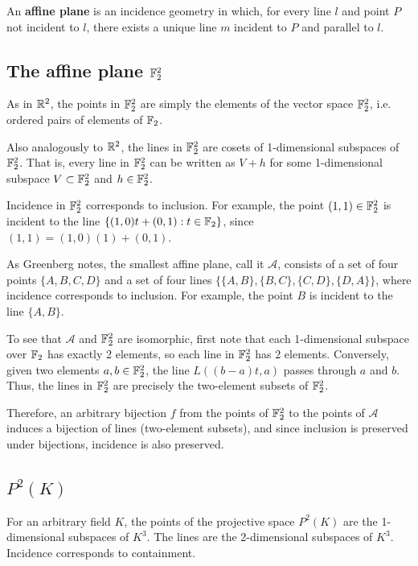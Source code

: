 \documentclass{article}
\begin{document}
\begin{definition} 
An \textbf{affine plane} is an incidence geometry in which, for every line $l$ and point $P$ not incident to $l$, there exists a unique line $m$ incident to $P$ and parallel to $l$.
\end{definition}


\subsection{The affine plane $\mathbb{F}_2^2$}
As in $\mathbb{R}^2$, the points in $\mathbb{F}_2^2$ are simply the elements of the vector space $\mathbb{F}_2^2$, i.e. ordered pairs of elements of $\mathbb{F}_2$.  

Also analogously to $\mathbb{R}^2$, the lines in $\mathbb{F}_2^2$ are cosets of 1-dimensional subspaces of $\mathbb{F}_2^2$.  That is, every line in $\mathbb{F}_2^2$ can be written as $V + h$ for some 1-dimensional subspace $V\subset \mathbb{F}_2^2$ and $h \in \mathbb{F}_2^2$.  

Incidence in $\mathbb{F}_2^2$ corresponds to inclusion.  For example, the point $(1,1) \in \mathbb{F}_2^2$ is incident to the line $\{(1,0)t + (0,1): t \in \mathbb{F}_2\}$, since $(1,1) = (1,0) (1) + (0,1)$.

As Greenberg notes, the smallest affine plane, call it $\mathcal{A}$, consists of a set of four points $\{A,B,C,D\}$ and a set of four lines $\{\{A,B\}, \{B,C\}, \{C,D\}, \{D,A\}\}$, where incidence corresponds to inclusion. For example, the point $B$ is incident to the line $\{A,B\}$.

To see that $\mathcal{A}$ and $\mathbb{F}_2^2$ are isomorphic, first note that each 1-dimensional subspace over $\mathbb{F}_2$ has exactly 2 elements, so each line in $\mathbb{F}_2^2$ has 2 elements.  Conversely, given two elements $a,b \in \mathbb{F}_2^2$, the line $L((b-a)t, a)$ passes through $a$ and $b$.  Thus, the lines in $\mathbb{F}_2^2$ are precisely the two-element subsets of $\mathbb{F}_2^2$. 

Therefore, an arbitrary bijection $f$ from the points of $\mathbb{F}_2^2$ to the points of $\mathcal A$ induces a bijection of lines (two-element subsets), and since inclusion is preserved under bijections, incidence is also preserved. 

\subsection{$P^2(K)$}
For an arbitrary field $K$, the points of the projective space $P^2(K)$ are the 1-dimensional subspaces of $K^3$.  The lines are the 2-dimensional subspaces of $K^3$.  Incidence corresponds to containment. 
\end{document}
